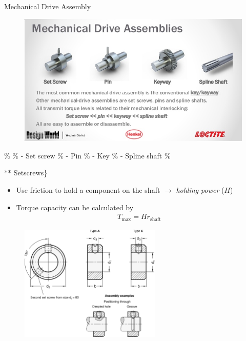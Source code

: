 \documentclass[10pt, svgnames]{beamer}
\begin{document}
\begin{frame}[label={sec:org4427caa}]{Mechanical Drive Assembly}
\begin{figure}[htbp]
  \centering
  \includegraphics[width=\textwidth]{Pictures/mech-drive}
\end{figure}
\%
\%       - Set screw
\%       - Pin
\%       - Key
\%       - Spline shaft
\%


** Setscrews\}

\begin{itemize}
\item Use friction to hold a component on the shaft \(\rightarrow\) \emph{holding power} (\(H\))
\item Torque capacity can be calculated by
\begin{align*}
  T_{\max} = Hr_{\text{shaft}}
\end{align*}
\end{itemize}

\begin{figure}[htbp]
  \centering
  \includegraphics[width=0.6\textwidth]{Pictures/set-screws}
\end{figure}



\end{frame}
\end{document}
